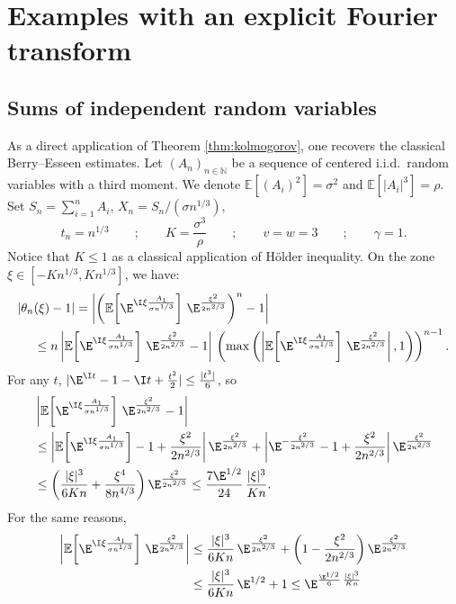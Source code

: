 \documentclass[envcountsame]{svmult}
\newcommand{\N}{\mathbb{N}}
\newcommand{\esper}{\mathbb{E}}
\begin{document}
\section{Examples with an explicit Fourier transform}
\label{Sect:First}



\subsection{Sums of independent random variables}\label{subsec:independent}
As a direct application of Theorem \ref{thm:kolmogorov}, one recovers the classical Berry--Esseen estimates. Let $(A_n)_{n \in \N}$ be a sequence of centered i.i.d.~random variables with a third moment. We denote $\esper[(A_i)^2]=\sigma^2$ and $\esper[|A_i|^3]=\rho$. Set $S_n=\sum_{i=1}^n A_i$, $X_n=S_n/(\sigma n^{1/3})$,
$$t_n=n^{1/3}\qquad;\qquad K=\frac{\sigma^3}{\rho}\qquad;\qquad v=w=3 \qquad;\qquad \gamma=1.$$
Notice that $K \leq 1$ as a classical application of Hölder inequality.
On the zone $\xi \in [-Kn^{1/3},Kn^{1/3}]$, we have:
\begin{align*}
|\theta_n&(\xi)-1| = \left|\left(\esper\!\left[\E^{\I \xi \frac{A_1}{\sigma n^{1/3}}}\right]\,\E^{\frac{\xi^2}{2n^{2/3}}}\right)^n-1\right| \\
&\leq n\left|\esper\!\left[\E^{\I \xi \frac{A_1}{\sigma n^{1/3}}}\right]\,\E^{\frac{\xi^2}{2n^{2/3}}}-1\right|\,\left(\max\left(\left|\esper\!\left[\E^{\I \xi \frac{A_1}{\sigma n^{1/3}}}\right]\,\E^{\frac{\xi^2}{2n^{2/3}}}\right|,1\right)\right)^{n-1}.
\end{align*}
For any $t$, $|\E^{\I t} - 1 - \I t + \frac{t^2}{2}| \leq \frac{|t^3|}{6}$, so
\begin{align*}
&\left|\esper\!\left[\E^{\I \xi \frac{A_1}{\sigma n^{1/3}}}\right]\,\E^{\frac{\xi^2}{2n^{2/3}}}-1\right| \\
&\leq \left|\esper\!\left[\E^{\I \xi \frac{A_1}{\sigma n^{1/3}}}\right] - 1+\frac{\xi^2}{2n^{2/3}}\right| \E^{\frac{\xi^2}{2n^{2/3}}} + \left|\E^{-\frac{\xi^2}{2n^{2/3}}}-1+\frac{\xi^2}{2n^{2/3}}\right| \E^{\frac{\xi^2}{2n^{2/3}}} \\
&\leq \left(\frac{|\xi|^3}{6Kn}+\frac{\xi^4}{8n^{4/3}}\right)\E^{\frac{\xi^2}{2n^{2/3}}} \leq \frac{7\E^{1/2}}{24}\,\frac{|\xi|^3}{Kn}.
\end{align*}
For the same reasons,
\begin{align*}
\left|\esper\!\left[\E^{\I \xi \frac{A_1}{\sigma n^{1/3}}}\right]\,\E^{\frac{\xi^2}{2n^{2/3}}}\right| & \leq \frac{|\xi|^3}{6Kn}\,\E^{\frac{\xi^2}{2n^{2/3}}} + \left(1-\frac{\xi^2}{2n^{2/3}}\right)\E^{\frac{\xi^2}{2n^{2/3}}} \\
& \leq \frac{|\xi|^3}{6Kn}\,\E^{1/2} + 1 \leq \E^{\frac{\E^{1/2}}{6}\, \frac{|\xi|^3}{Kn}}
\end{align*}
\end{document}
